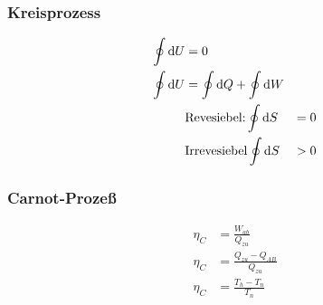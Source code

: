 \begin{multicols}{2}
\subsubsection*{Kreisprozess}
\begin{align*}
\oint \mathop{}\!\mathrm{d} U&=0\\
\oint \mathop{}\!\mathrm{d} U&= \oint \mathop{}\!\mathrm{d} Q +\oint \mathop{}\!\mathrm{d} W\\
&\text{Revesiebel:}
\oint \mathop{}\!\mathrm{d} S&=0\\
&\text{Irrevesiebel}
\oint \mathop{}\!\mathrm{d} S&>0\\
\end{align*}

\subsubsection*{Carnot-Prozeß}
\begin{align*}
\eta_C&=\frac{W_{ab}}{Q_{zu}}\\
\eta_C&=\frac{Q_{zu}-Q_{AB}}{Q_{zu}}\\
\eta_C&=\frac{T_h-T_n}{T_n}
\end{align*}
\vfill
\end{multicols}